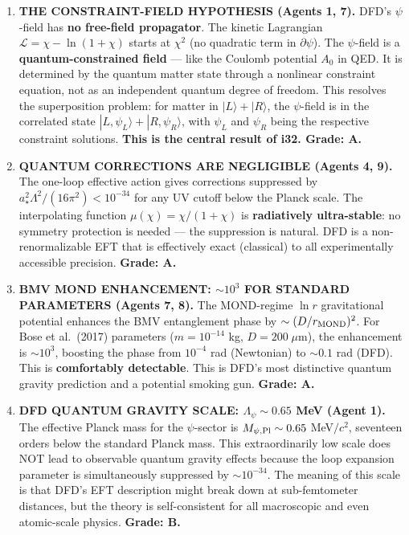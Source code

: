 \documentclass[11pt,a4paper]{article}
\begin{document}
\begin{enumerate}

\item \textbf{THE CONSTRAINT-FIELD HYPOTHESIS (Agents 1, 7).} DFD's $\psi$-field has \textbf{no free-field propagator}. The kinetic Lagrangian $\mathcal{L} = \chi - \ln(1+\chi)$ starts at $\chi^2$ (no quadratic term in $\partial\psi$). The $\psi$-field is a \textbf{quantum-constrained field} --- like the Coulomb potential $A_0$ in QED. It is determined by the quantum matter state through a nonlinear constraint equation, not as an independent quantum degree of freedom. This resolves the superposition problem: for matter in $|L\rangle + |R\rangle$, the $\psi$-field is in the correlated state $|L,\psi_L\rangle + |R,\psi_R\rangle$, with $\psi_L$ and $\psi_R$ being the respective constraint solutions. \textbf{This is the central result of i32. Grade: A.}

\item \textbf{QUANTUM CORRECTIONS ARE NEGLIGIBLE (Agents 4, 9).} The one-loop effective action gives corrections suppressed by $a_\star^2\Lambda^2/(16\pi^2) < 10^{-34}$ for any UV cutoff below the Planck scale. The interpolating function $\mu(\chi) = \chi/(1+\chi)$ is \textbf{radiatively ultra-stable}: no symmetry protection is needed --- the suppression is natural. DFD is a non-renormalizable EFT that is effectively exact (classical) to all experimentally accessible precision. \textbf{Grade: A.}

\item \textbf{BMV MOND ENHANCEMENT: $\sim 10^3$ FOR STANDARD PARAMETERS (Agents 7, 8).} The MOND-regime $\ln r$ gravitational potential enhances the BMV entanglement phase by $\sim (D/r_{\rm MOND})^2$. For Bose et al.\ (2017) parameters ($m = 10^{-14}$ kg, $D = 200\;\mu$m), the enhancement is $\sim 10^3$, boosting the phase from $10^{-4}$ rad (Newtonian) to $\sim 0.1$ rad (DFD). This is \textbf{comfortably detectable}. This is DFD's most distinctive quantum gravity prediction and a potential smoking gun. \textbf{Grade: A.}

\item \textbf{DFD QUANTUM GRAVITY SCALE: $\Lambda_\psi \sim 0.65$ MeV (Agent 1).} The effective Planck mass for the $\psi$-sector is $M_{\psi,\rm Pl} \sim 0.65$ MeV$/c^2$, seventeen orders below the standard Planck mass. This extraordinarily low scale does NOT lead to observable quantum gravity effects because the loop expansion parameter is simultaneously suppressed by $\sim 10^{-34}$. The meaning of this scale is that DFD's EFT description might break down at sub-femtometer distances, but the theory is self-consistent for all macroscopic and even atomic-scale physics. \textbf{Grade: B.}


\end{enumerate}
\end{document}
